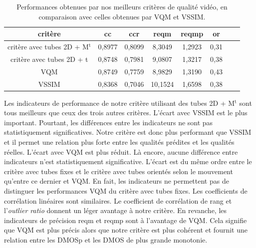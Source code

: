 \begin{table}[htbp]
\centering
\begin{tabular}{cccccccc}\toprule
\textbf{critère}												& \textbf{cc}	& \textbf{ccr}	& \textbf{reqm}	& \textbf{reqmp}	& \textbf{or}		\\ \toprule
critère avec tubes 2D + M$^\text{t}$				& 0,8977			& 0,8099			& 8,3049				& 1,2923				& 0,31					\\ \midrule
critère avec tubes 2D + t									& 0,8748			& 0,7981			& 9,0807				& 1,3217				& 0,38					\\ \midrule
VQM																	& 0,8749			& 0,7759			& 8,9829				& 1,3190				& 0,43					\\ \midrule
VSSIM																& 0,8368			& 0,7046			& 10,1524			& 1,6598 				& 0,38					\\ \bottomrule
\end{tabular}
\caption{Performances obtenues par nos meilleurs critères de qualité vidéo, en comparaison avec celles obtenues par VQM et VSSIM.}
\label{tab:MQV2PerfVQMVSSIM}
\end{table}

Les indicateurs de performance de notre critère utilisant des tubes 2D + M$^\text{t}$ sont tous meilleurs que ceux des trois autres critères. L'écart avec VSSIM est le plus important. Pourtant, les différences entre les indicateurs ne sont pas statistiquement significatives. Notre critère est donc plus performant que VSSIM et il permet une relation plus forte entre les qualités prédites et les qualités réelles. L'écart avec VQM est plus réduit. Là encore, aucune différence entre indicateurs n'est statistiquement significative. L'écart est du même ordre entre le critère avec tubes fixes et le critère avec tubes orientés selon le mouvement qu'entre ce dernier et VQM. En fait, les indicateurs ne permettent pas de distinguer les performances VQM du critère avec tubes fixes. Les coefficients de corrélation linéaires sont similaires. Le coefficient de corrélation de rang et l'\emph{outlier ratio} donnent un léger avantage à notre critère. En revanche, les indicateurs de précision reqm et reqmp sont à l'avantage de VQM. Cela signifie que VQM est plus précis alors que notre critère est plus cohérent et fournit une relation entre les DMOSp et les DMOS de plus grande monotonie.

